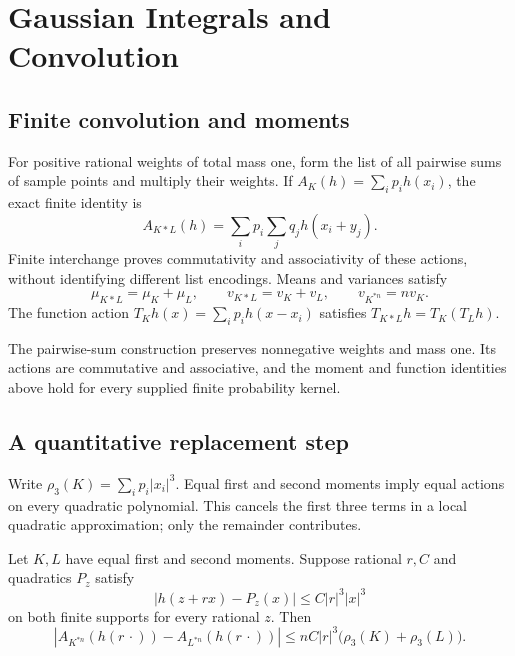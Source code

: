 \chapter{Gaussian Integrals and Convolution}\label{ch:gaussian-convolution}

\section{Finite convolution and moments}

For positive rational weights of total mass one, form the list of all
pairwise sums of sample points and multiply their weights. If
$A_K(h)=\sum_i p_i h(x_i)$, the exact finite identity is
\[
 A_{K*L}(h)=\sum_i p_i\sum_jq_jh(x_i+y_j).
\]
Finite interchange proves commutativity and associativity of these actions,
without identifying different list encodings. Means and variances satisfy
\[
 \mu_{K*L}=\mu_K+\mu_L,\qquad v_{K*L}=v_K+v_L,
 \qquad v_{K^{*n}}=nv_K.
\]
The function action $T_Kh(x)=\sum_i p_i h(x-x_i)$ satisfies
$T_{K*L}h=T_K(T_Lh)$.

\begin{theorem}
\label{thm:finite-convolution-laws}
The pairwise-sum construction preserves nonnegative weights and mass one.
Its actions are commutative and associative, and the moment and function
identities above hold for every supplied finite probability kernel.
\leanok
\end{theorem}

\section{A quantitative replacement step}

Write $\rho_3(K)=\sum_i p_i|x_i|^3$. Equal first and second moments imply
equal actions on every quadratic polynomial. This cancels the first three
terms in a local quadratic approximation; only the remainder contributes.

\begin{theorem}
\label{thm:finite-convolution-replacement}
Let $K,L$ have equal first and second moments. Suppose rational $r,C$ and
quadratics $P_z$ satisfy
\[
 |h(z+rx)-P_z(x)|\le C|r|^3|x|^3
\]
on both finite supports for every rational $z$. Then
\[
 \left|A_{K^{*n}}(h(r\,\cdot))-A_{L^{*n}}(h(r\,\cdot))\right|
 \le nC|r|^3\bigl(\rho_3(K)+\rho_3(L)\bigr).
\]
\leanok
\end{theorem}

